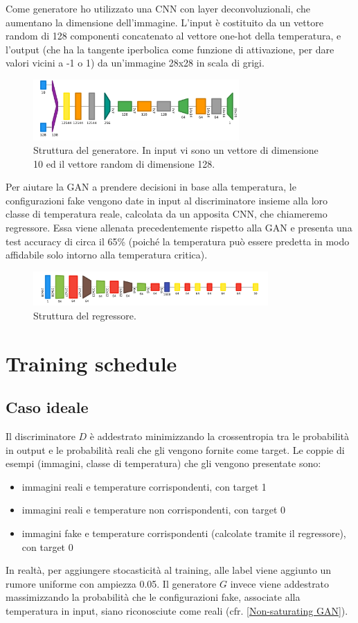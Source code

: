 \documentclass[Lau, noexaminfo, oneside]{sapthesis} %
\begin{document}
Come generatore ho utilizzato una CNN con layer deconvoluzionali, che aumentano la dimensione dell'immagine. L'input è costituito da un vettore random di 128 componenti concatenato al vettore one-hot della temperatura, e l'output (che ha la tangente iperbolica come funzione di attivazione, per dare valori vicini a -1 o 1) da un'immagine 28x28 in scala di grigi.
\begin{figure}[H]
\includegraphics[width=0.7\textwidth]{gen.png}
\centering
\caption{Struttura del generatore. In input vi sono un vettore di dimensione 10 ed il vettore random di dimensione 128.}
\end{figure}
Per aiutare la GAN a prendere decisioni in base alla temperatura, le configurazioni fake vengono date in input al discriminatore insieme alla loro classe di temperatura reale, calcolata da un apposita CNN, che chiameremo regressore. Essa viene allenata precedentemente rispetto alla GAN e presenta una test accuracy di circa il 65\% (poiché la temperatura può essere predetta in modo affidabile solo intorno alla temperatura critica).
\begin{figure}[H]
\includegraphics[width=0.8\textwidth]{reg.png}
\centering
\caption{Struttura del regressore.}
\end{figure}
\section{Training schedule}
\subsection{Caso ideale}
\label{Caso ideale}
Il discriminatore $D$ è addestrato minimizzando la crossentropia tra le probabilità in output e le probabilità reali che gli vengono fornite come target. Le coppie di esempi (immagini, classe di temperatura) che gli vengono presentate sono:
\begin{itemize}
\item immagini reali e temperature corrispondenti, con target 1
\item immagini reali e temperature non corrispondenti, con target 0
\item immagini fake e temperature corrispondenti (calcolate tramite il regressore), con target 0
\end{itemize}
In realtà, per aggiungere stocasticità al training, alle label viene aggiunto un rumore uniforme con ampiezza 0.05.
Il generatore $G$ invece viene addestrato massimizzando la probabilità che le configurazioni fake, associate alla temperatura in input, siano riconosciute come reali (cfr. \ref{Non-saturating GAN}).
\end{document}
